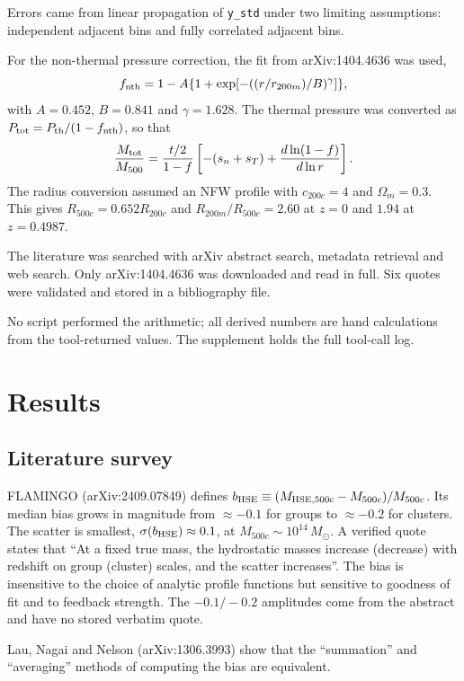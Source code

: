 \documentclass[11pt,a4paper]{article}
\begin{document}
Errors came from linear propagation of \texttt{y\_std} under two limiting assumptions: independent adjacent bins and fully correlated adjacent bins.

For the non-thermal pressure correction, the fit from arXiv:1404.4636 was used,
\begin{equation}
f_{\rm nth}=1-A\{1+\exp[-((r/r_{200m})/B)^\gamma]\},
\end{equation}
with $A=0.452$, $B=0.841$ and $\gamma=1.628$. The thermal pressure was converted as $P_{\rm tot}=P_{\rm th}/(1-f_{\rm nth})$, so that
\begin{equation}
\frac{M_{\rm tot}}{M_{500}}=\frac{t/2}{1-f}\left[-(s_n+s_T)+\frac{d\ln(1-f)}{d\ln r}\right].
\end{equation}
The radius conversion assumed an NFW profile with $c_{200c}=4$ and $\Omega_m=0.3$. This gives $R_{500c}=0.652R_{200c}$ and $R_{200m}/R_{500c}=2.60$ at $z=0$ and $1.94$ at $z=0.4987$.

The literature was searched with arXiv abstract search, metadata retrieval and web search. Only arXiv:1404.4636 was downloaded and read in full. Six quotes were validated and stored in a bibliography file.

No script performed the arithmetic; all derived numbers are hand calculations from the tool-returned values. The supplement holds the full tool-call log.

\section{Results}
\subsection{Literature survey}
FLAMINGO (arXiv:2409.07849) defines $b_{\rm HSE}\equiv(M_{\rm HSE,500c}-M_{500c})/M_{500c}$. Its median bias grows in magnitude from $\approx-0.1$ for groups to $\approx-0.2$ for clusters. The scatter is smallest, $\sigma(b_{\rm HSE})\approx0.1$, at $M_{500c}\sim10^{14}\,M_\odot$. A verified quote states that ``At a fixed true mass, the hydrostatic masses increase (decrease) with redshift on group (cluster) scales, and the scatter increases''. The bias is insensitive to the choice of analytic profile functions but sensitive to goodness of fit and to feedback strength. The $-0.1/-0.2$ amplitudes come from the abstract and have no stored verbatim quote.

Lau, Nagai and Nelson (arXiv:1306.3993) show that the ``summation'' and ``averaging'' methods of computing the bias are equivalent.
\end{document}
